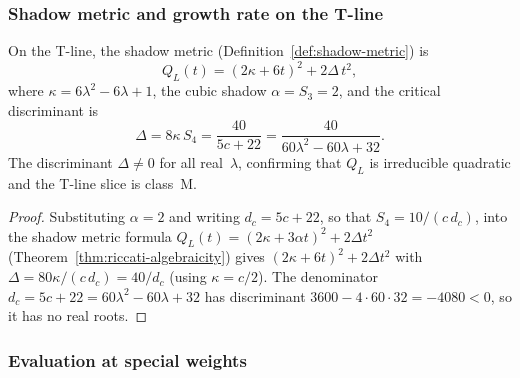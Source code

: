 \subsubsection{Shadow metric and growth rate on the T-line}

\begin{proposition}
\label{prop:betagamma-shadow-metric}
On the T-line, the shadow metric
\textup{(}Definition~\textup{\ref{def:shadow-metric})} is
\begin{equation}\label{eq:bg-shadow-metric}
 Q_L(t)
 = (2\kappa + 6t)^2 + 2\Delta\, t^2,
\end{equation}
where $\kappa = 6\lambda^2 - 6\lambda + 1$, the cubic shadow
$\alpha = S_3 = 2$, and the critical discriminant is
\begin{equation}\label{eq:bg-critical-discriminant}
 \Delta
 = 8\kappa\, S_4
 = \frac{40}{5c + 22}
 = \frac{40}{60\lambda^2 - 60\lambda + 32}.
\end{equation}
The discriminant $\Delta \neq 0$ for all real~$\lambda$, confirming
that $Q_L$ is irreducible quadratic and the T-line slice is
class~M.
\end{proposition}

\begin{proof}
Substituting $\alpha = 2$ and writing $d_c=5c+22$, so that
$S_4=10/(c\,d_c)$, into the shadow
metric formula $Q_L(t) = (2\kappa + 3\alpha t)^2 + 2\Delta t^2$
(Theorem~\ref{thm:riccati-algebraicity}) gives
$(2\kappa + 6t)^2 + 2\Delta t^2$ with
$\Delta = 80\kappa/(c\,d_c)=40/d_c$
(using $\kappa = c/2$). The denominator
$d_c=5c+22=60\lambda^2-60\lambda+32$
has discriminant $3600 - 4 \cdot 60 \cdot 32 = -4080 < 0$, so it has
no real roots.\qedhere
\end{proof}

\subsubsection{Evaluation at special weights}

